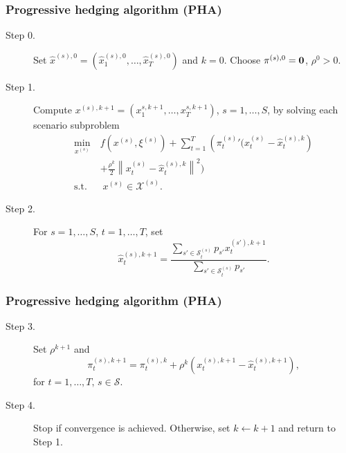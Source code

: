 \documentclass{beamer}
\def\cS{\mathcal{S}}
\begin{document}
\begin{frame}
\frametitle{Progressive hedging algorithm (PHA)}

\begin{description}
	\item[Step 0.]
	Set $\hat{x}^{(s) ,0} = \left(\hat{x}_1^{(s),0}, \dots, \hat{x}_T^{(s),0}\right)$ and $k = 0$. Choose $\pi^{(s),0} = \bf{0}$, $\rho^0 > 0$.
	\item[Step 1.]
	Compute $x^{(s),k+1} =  (x_1^{s,k+1}, \dots, x_T^{s,k+1})$, $s = 1,\ldots,S$, by solving each scenario subproblem
	$$
	\begin{aligned}
	\min_{x^{(s)}} \ &  f\left( x^{(s)}, \xi^{(s)} \right) + \sum_{t = 1}^T \left( {\pi_t^{(s)}}' \biggl(x_t^{(s)} - \hat{x}_t^{(s),k}\right) \\
	& + \frac{\rho^k}{2} \left\| x_t^{(s)} - \hat{x}_t^{(s),k} \right\|^2 \biggr)\\
	\text{s.t.} & \; x^{(s)}  \in \mathcal{X}^{(s)}.
	\end{aligned}
	$$
	\item[Step 2.]
	For $s = 1,\ldots,S$, $t = 1,\ldots,T$, set
	\[
	\hat{x}_t^{(s),k+1} = \frac{\sum_{s' \in \cS_{t}^{(s)}} p_{s'} x_t^{(s'),k+1}}{\sum_{s' \in \cS_t^{(s)}} p_{s'}}.
	\]
\end{description}

\end{frame}

\begin{frame}
\frametitle{Progressive hedging algorithm (PHA)}

\begin{description}
	\item[Step 3.]
	Set $\rho^{k+1}$ and
	\[
	\pi_t^{(s), k+1} =  \pi_t^{(s),k} + \rho^k \left( x_t^{(s),k+1} -  \hat{x}_t^{(s),k+1}  \right),
	\]
	for $t = 1, \dots, T, \, s \in \mathcal{S}$.
	\item[Step 4.]
	Stop if convergence is achieved.
	Otherwise, set $k \leftarrow k + 1$ and return to Step 1.
\end{description}

\end{frame}
\end{document}
